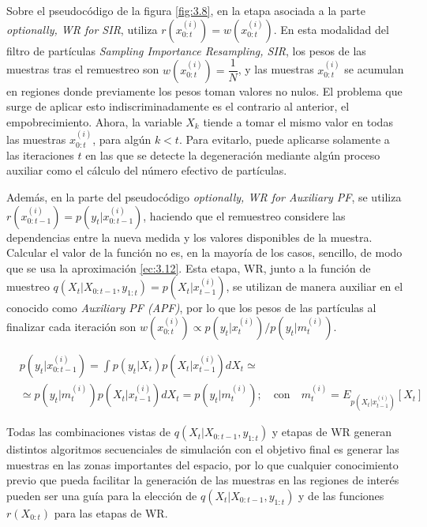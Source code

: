 Sobre el pseudocódigo de la figura \ref{fig:3.8}, en la etapa asociada a la parte \textit{optionally, WR for SIR}, utiliza $r\left(x_{0:t}^{(i)}\right) = w\left(x_{0:t}^{(i)}\right)$. En esta modalidad del filtro de partículas \textit{Sampling Importance Resampling, SIR}, los pesos de las muestras tras el remuestreo son $w\left(x_{0:t}^{(i)}\right) = \dfrac{1}{N}$, y las muestras $x_{0:t}^{(i)}$ se acumulan en regiones donde previamente los pesos toman valores no nulos. El problema que surge de aplicar esto indiscriminadamente es el contrario al anterior, el empobrecimiento. Ahora, la variable $X_k$ tiende a tomar el mismo valor en todas las muestras $x_{0:t}^{(i)}$, para algún $k < t$. Para evitarlo, puede aplicarse solamente a las iteraciones $t$ en las que se detecte la degeneración mediante algún proceso auxiliar como el cálculo del número efectivo de partículas.

Además, en la parte del pseudocódigo \textit{optionally, WR for Auxiliary PF}, se utiliza $r\left(x_{0:t-1}^{(i)}\right) = p\left(y_t|x_{0:t-1}^{(i)}\right)$, haciendo que el remuestreo considere las dependencias entre la nueva medida y los valores disponibles de la muestra. Calcular el valor de la función no es, en la mayoría de los casos, sencillo, de modo que se usa la aproximación \ref{ec:3.12}.
Esta etapa, WR, junto a la función de muestreo $q\left(X_{t}|X_{0:t-1},y_{1:t}\right) = p\left(X_t|x_{t-1}^{(i)}\right)$, se utilizan de manera auxiliar en el conocido como \textit{Auxiliary PF (APF)}, por lo que los pesos de las partículas al finalizar cada iteración son $w\left(x_{0:t}^{(i)}\right) \propto p\left(y_t|x_t^{(i)}\right)/ p\left(y_t|m_t^{(i)}\right)$.

\begin{equation}
    \begin{aligned}
        &p\left(y_t|x_{0:t-1}^{(i)}\right) = \int p\left(y_t|X_t\right)p\left(X_t|x_{t-1}^{(i)}\right)dX_t \simeq \\
        &\simeq p\left(y_t|m_t^{(i)}\right)p\left(X_t|x_{t-1}^{(i)}\right)dX_t = p\left(y_t|m_t^{(i)}\right) ; \quad \text{con} \quad m_t^{(i)} = E_{p\left(X_t|x_{t-1}^{(i)}\right)}[X_t]
    \end{aligned}
    \label{ec:3.12}
\end{equation}

Todas las combinaciones vistas de $q\left(X_{t}|X_{0:t-1},y_{1:t}\right)$ y etapas de WR generan distintos algoritmos secuenciales de simulación con el objetivo final es generar las muestras en las zonas importantes del espacio, por lo que cualquier conocimiento previo que pueda facilitar la generación de las muestras en las regiones de interés pueden ser una guía para la elección de $q\left(X_{t}|X_{0:t-1},y_{1:t}\right)$ y de las funciones $r\left(X_{0:t}\right)$ para las etapas de WR.

